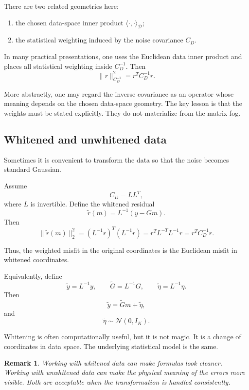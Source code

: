 \documentclass[11pt,a4paper]{book}
\newtheorem{remark}[definition]{Remark}
\newcommand{\D}{\mathcal{D}}      %
\newcommand{\noise}{\eta}
\newcommand{\obs}{y}
\newcommand{\G}{G}
\begin{document}
There are two related geometries here:
\begin{enumerate}[label=\arabic*.]
    \item the chosen data-space inner product $\langle\cdot,\cdot\rangle_{\D}$;
    \item the statistical weighting induced by the noise covariance $C_D$.
\end{enumerate}

In many practical presentations, one uses the Euclidean data inner product and
places all statistical weighting inside $C_D^{-1}$. Then
\[
    \|r\|_{C_D^{-1}}^2
    =
    r^T C_D^{-1} r.
\]

More abstractly, one may regard the inverse covariance as an operator whose
meaning depends on the chosen data-space geometry. The key lesson is that the
weights must be stated explicitly. They do not materialize from the matrix fog.

\subsection{Whitened and unwhitened data}

Sometimes it is convenient to transform the data so that the noise becomes
standard Gaussian.

Assume
\[
    C_D = LL^T,
\]
where $L$ is invertible. Define the whitened residual
\[
    \widetilde{r}(m)
    =
    L^{-1}(\obs-\G m).
\]
Then
\[
    \|\widetilde{r}(m)\|_2^2
    =
    (L^{-1}r)^T(L^{-1}r)
    =
    r^T L^{-T}L^{-1}r
    =
    r^T C_D^{-1} r.
\]

Thus, the weighted misfit in the original coordinates is the Euclidean misfit
in whitened coordinates.

Equivalently, define
\[
    \widetilde{\obs}=L^{-1}\obs,
    \qquad
    \widetilde{\G}=L^{-1}\G,
    \qquad
    \widetilde{\noise}=L^{-1}\noise.
\]
Then
\[
    \widetilde{\obs}
    =
    \widetilde{\G}m
    +
    \widetilde{\noise},
\]
and
\[
    \widetilde{\noise}
    \sim
    \mathcal{N}(0,I_K).
\]

Whitening is often computationally useful, but it is not magic. It is a change
of coordinates in data space. The underlying statistical model is the same.

\begin{remark}
Working with whitened data can make formulas look cleaner. Working with
unwhitened data can make the physical meaning of the errors more visible. Both
are acceptable when the transformation is handled consistently.
\end{remark}
\end{document}
